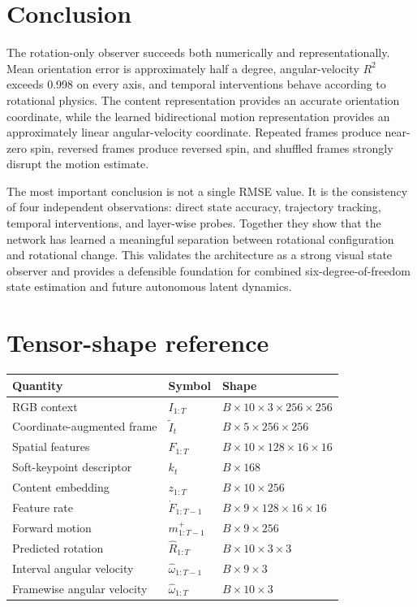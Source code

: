 \documentclass[11pt,a4paper]{article}
\begin{document}
\section{Conclusion}
The rotation-only observer succeeds both numerically and representationally. Mean orientation error is approximately half a degree, angular-velocity $R^2$ exceeds 0.998 on every axis, and temporal interventions behave according to rotational physics. The content representation provides an accurate orientation coordinate, while the learned bidirectional motion representation provides an approximately linear angular-velocity coordinate. Repeated frames produce near-zero spin, reversed frames produce reversed spin, and shuffled frames strongly disrupt the motion estimate.

The most important conclusion is not a single RMSE value. It is the consistency of four independent observations: direct state accuracy, trajectory tracking, temporal interventions, and layer-wise probes. Together they show that the network has learned a meaningful separation between rotational configuration and rotational change. This validates the architecture as a strong visual state observer and provides a defensible foundation for combined six-degree-of-freedom state estimation and future autonomous latent dynamics.

\appendix
\section{Tensor-shape reference}
\begin{table}[H]
\centering
\begin{tabular}{lll}
\toprule
Quantity & Symbol & Shape\\
\midrule
RGB context & $I_{1:T}$ & $B\times10\times3\times256\times256$\\
Coordinate-augmented frame & $\tilde I_t$ & $B\times5\times256\times256$\\
Spatial features & $F_{1:T}$ & $B\times10\times128\times16\times16$\\
Soft-keypoint descriptor & $k_t$ & $B\times168$\\
Content embedding & $z_{1:T}$ & $B\times10\times256$\\
Feature rate & $\dot F_{1:T-1}$ & $B\times9\times128\times16\times16$\\
Forward motion & $m^+_{1:T-1}$ & $B\times9\times256$\\
Predicted rotation & $\hat R_{1:T}$ & $B\times10\times3\times3$\\
Interval angular velocity & $\hat\omega_{1:T-1}$ & $B\times9\times3$\\
Framewise angular velocity & $\hat\omega_{1:T}$ & $B\times10\times3$\\
\bottomrule
\end{tabular}
\end{table}
\end{document}
